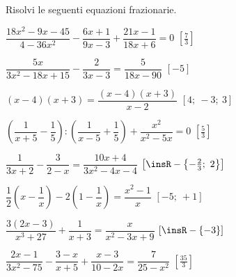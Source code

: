 \begin{esercizio}[\Ast]
\label{ese:20.28}
Risolvi le seguenti equazioni frazionarie.
\begin{enumeratea}
 \item $\dfrac{18x^{2}-9x-45}{4-36x^{2}}-\dfrac{6x+1}{9x-3}+
        \dfrac{21x-1}{18x+6}=0$ \hfill $\left[\frac{7}{3}\right]$
 \item $\dfrac{5x}{3x^{2}-18x+15}-\dfrac{2}{3x-3}=\dfrac{5}{18x-90}$
  \hfill $\left[-5\right]$
 \item $(x-4)(x+3)=\dfrac{(x-4)(x+3)}{x-2}$
  \hfill $\left[4;~-3;~3\right]$
 \item $\left(\dfrac{1}{x+5}-\dfrac{1}{5}\right):\left(\dfrac{1}{x-5}+
        \dfrac{1}{5}\right)+\dfrac{x^{2}}{x^{2}-5x}=0$
  \hfill $\left[\frac{5}{3}\right]$
 \item $\dfrac{1}{3x+2}-\dfrac{3}{2-x}=\dfrac{10x+4}{3x^{2}-4x-4}$
  \hfill $\left[\insR-\left\{-{\frac{2}{3}};~2\right\}\right]$
 \item $\dfrac{1}{2} \left(x-\dfrac{1}{x}\right)-
        2\left(1-\dfrac{1}{x}\right)=\dfrac{x^{2}-1}{x}$
  \hfill $\left[-5;~+1\right]$
 \item $\dfrac{3(2x-3)}{x^{3}+27}+\dfrac{1}{x+3}=\dfrac{x}{x^{2}-3x+9}$
  \hfill $\left[\insR-\{-3\}\right]$
 \item $\dfrac{2x-1}{3x^{2}-75}-\dfrac{3-x}{x+5}+\dfrac{x-3}{10-2x}=
        \dfrac{7}{25-x^{2}}$
  \hfill $\left[\frac{35}{3}\right]$
\end{enumeratea}
\end{esercizio}

